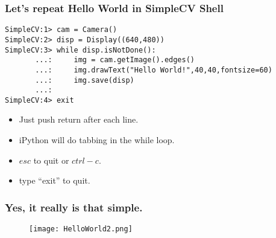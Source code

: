 \documentclass[compress]{beamer}
\begin{document}
\begin{frame}[fragile] 
\frametitle{Let's repeat Hello World  in SimpleCV  Shell}
\begin{example}
\begin{verbatim}
SimpleCV:1> cam = Camera()
SimpleCV:2> disp = Display((640,480))
SimpleCV:3> while disp.isNotDone():
       ...:     img = cam.getImage().edges()
       ...:     img.drawText("Hello World!",40,40,fontsize=60)
       ...:     img.save(disp)
       ...:     
SimpleCV:4> exit
\end{verbatim}
\end{example}
\begin{itemize}
\item Just push return after each line.
\item iPython will do tabbing in the while loop.
\item $esc$ to quit or $ctrl-c$.
\item type ``exit'' to quit.
\end{itemize}
\end{frame}
\begin{frame}
\frametitle{Yes, it really is that simple.}
\begin{figure}
  \texttt{[image: HelloWorld2.png]}
\end{figure}
\end{frame}
\end{document}
